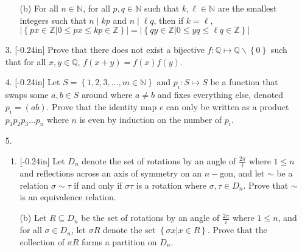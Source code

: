\documentclass[letterpaper,12pt]{article}
\newcommand{\set}[1]{\left\{ #1 \right\}}
\theoremstyle{definition}
\begin{document}
\pagebreak
\begin{enumerate}
    \item[] \begin{enumerate}
        \item[(b)] For all $n \in \mathbb{N}$, for all $p,q \in \mathbb{N}$ such that $k,\ell \in \mathbb{N}$ are the smallest integers such that $n \mid kp$ and $n \mid \ell q$, then if $k = \ell$, $|\set{ px \in \mathbb{Z} | 0 \leq px \leq kp \in \mathbb{Z}}| = |\set{ qy \in \mathbb{Z} | 0 \leq y q \leq \ell q \in \mathbb{Z}}|$
    \end{enumerate}
\end{enumerate}
\pagebreak
\begin{enumerate}
    \item[3. ]\reversemarginpar{}[-0.24in] Prove that there does not exist a bijective $f: \mathbb{Q} \mapsto \mathbb{Q}\backslash \set{0}$ such that for all $x,y \in \mathbb{Q}$, $f(x+y) = f(x)f(y)$.
\end{enumerate}
\pagebreak
\begin{enumerate}
    \item[4.]\reversemarginpar{}[-0.24in] Let $S = \set{1,2,3,\ldots,m \in \mathbb{N}}$ and $p_i:S \mapsto S$ be a function that swaps some $a,b \in S$ around where $a \neq b$ and fixes everything else, denoted $p_i = (ab)$. Prove that the identity map $e$ can only be written as a product $p_1p_2p_3\ldots p_n$ where $n$ is even by induction on the number of $p_i$.
\end{enumerate}
\pagebreak
\begin{enumerate}
    \item[5.]  \begin{enumerate}
    \item \reversemarginpar{}[-0.24in] 
Let $D_n$ denote the set of rotations by an angle of $\frac{2\pi}{i}$ where $1 \leq n$ and reflections across an axis of symmetry on an $n-$gon, and let $\sim$ be a relation $\sigma \sim \tau$ if and only if $\sigma \tau$ is a rotation where $\sigma, \tau \in D_n$. Prove that $\sim$ is an equivalence relation.
\end{enumerate}
\end{enumerate}
\pagebreak
\begin{enumerate}
    \item[] \begin{enumerate}
        \item[(b)] Let $R \subseteq D_n$ be the set of rotations by an angle of $\frac{2\pi}{i}$ where $1 \leq n$, and for all $\sigma \in D_n$, let $\sigma R$ denote the set $\set{\sigma x | x \in R}$. Prove that the collection of $\sigma R$ forms a partition on $D_n$. 
    \end{enumerate}
\end{enumerate}
\end{document}
